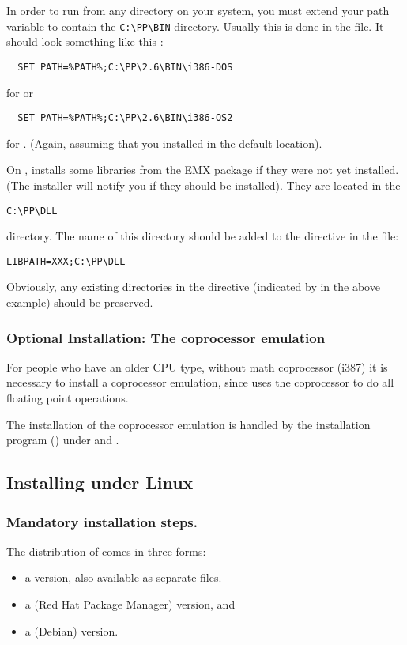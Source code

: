 In order to run \fpc from any directory on your system, you must extend
your path variable to contain the \verb|C:\PP\BIN| directory.
Usually this is done in the  file.
It should look something like this :
\begin{verbatim}
  SET PATH=%PATH%;C:\PP\2.6\BIN\i386-DOS
\end{verbatim}
for \dos or
\begin{verbatim}
  SET PATH=%PATH%;C:\PP\2.6\BIN\i386-OS2
\end{verbatim}
for \ostwo.
(Again, assuming that you installed in the default location).

On \ostwo, \fpc installs some libraries from the EMX package if they
were not yet installed. (The installer will notify you if they should be
installed). They are located in the
\begin{verbatim}
C:\PP\DLL
\end{verbatim}
directory. The name of this directory should be added to the 
directive in the  file:
\begin{verbatim}
LIBPATH=XXX;C:\PP\DLL
\end{verbatim}
Obviously, any existing directories in the  directive
(indicated by  in the above example) should be preserved.

\subsubsection{Optional Installation: The coprocessor emulation}
For people who have an older CPU type, without math coprocessor (i387)
it is necessary to install a coprocessor emulation, since \fpc uses the
coprocessor to do all floating point operations.

The installation of the coprocessor emulation is handled by the
installation program () under \dos and \windows.

%
%
\subsection{Installing under Linux}
\subsubsection{Mandatory installation steps.}
The \linux distribution of \fpc comes in three forms:
\begin{itemize}
\item a  version, also available as separate files.
\item a  (Red Hat Package Manager) version, and
\item a  (Debian) version.
\end{itemize}

